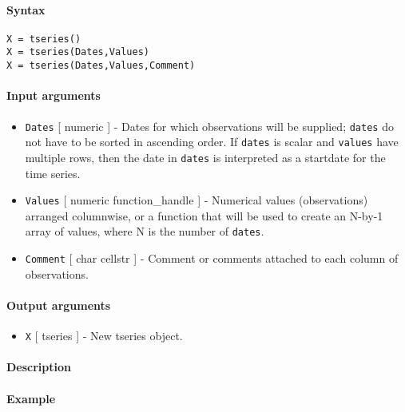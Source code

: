 


	\paragraph{Syntax}\label{syntax}

\begin{verbatim}
X = tseries()
X = tseries(Dates,Values)
X = tseries(Dates,Values,Comment)
\end{verbatim}

\paragraph{Input arguments}\label{input-arguments}

\begin{itemize}
\item
  \texttt{Dates} {[} numeric {]} - Dates for which observations will be
  supplied; \texttt{dates} do not have to be sorted in ascending order.
  If \texttt{dates} is scalar and \texttt{values} have multiple rows,
  then the date in \texttt{dates} is interpreted as a startdate for the
  time series.
\item
  \texttt{Values} {[} numeric \textbar{} function\_handle {]} -
  Numerical values (observations) arranged columnwise, or a function
  that will be used to create an N-by-1 array of values, where N is the
  number of \texttt{dates}.
\item
  \texttt{Comment} {[} char \textbar{} cellstr {]} - Comment or comments
  attached to each column of observations.
\end{itemize}

\paragraph{Output arguments}\label{output-arguments}

\begin{itemize}
\itemsep1pt\parskip0pt
\item
  \texttt{X} {[} tseries {]} - New tseries object.
\end{itemize}

\paragraph{Description}\label{description}

\paragraph{Example}\label{example}


